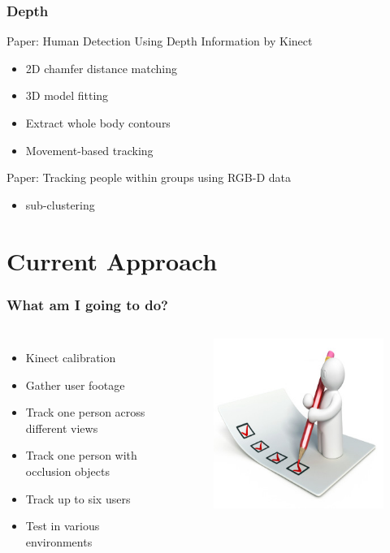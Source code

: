 \documentclass{beamer}
\begin{document}
\begin{frame}
\frametitle{Depth}
Paper: Human Detection Using Depth Information by Kinect \cite{detection_depth}
\begin{itemize}
	\item 2D chamfer distance matching
	\item 3D model fitting
	\item Extract whole body contours
	\item Movement-based tracking
\end{itemize}
Paper: Tracking people within groups using RGB-D data \cite{rgbd}
\begin{itemize}
	\item sub-clustering
\end{itemize}
\end{frame}

\section{Current Approach}

\begin{frame}
\frametitle{What am I going to do?}
\begin{columns}[c]
\begin{itemize}
	\item Kinect calibration
	\item Gather user footage
	\item Track one person across different views
	\item Track one person with occlusion objects
	\item Track up to six users
	\item Test in various environments
\end{itemize}
\begin{figure}
\includegraphics[width=0.8\linewidth]{checklist}
\end{figure}
\end{columns}
\end{frame}
\end{document}
